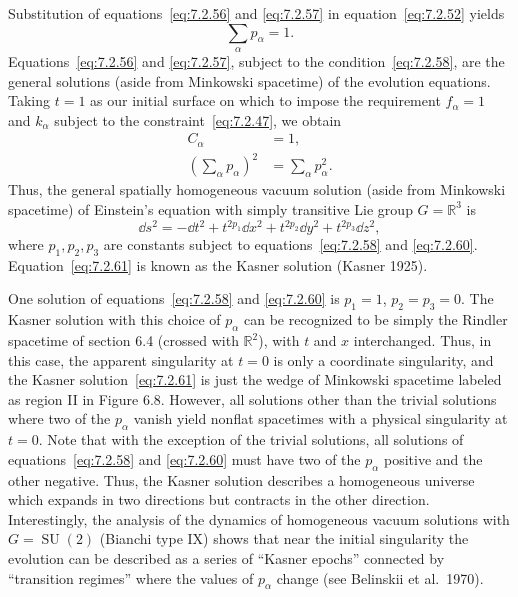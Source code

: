 Substitution of equations~\eqref{eq:7.2.56} and \eqref{eq:7.2.57} in
equation~\eqref{eq:7.2.52} yields
\begin{equation}
  \sum_\alpha p_\alpha=1 .
  \tag{7.2.58}\label{eq:7.2.58}
\end{equation}
Equations~\eqref{eq:7.2.56} and \eqref{eq:7.2.57}, subject to the
condition~\eqref{eq:7.2.58}, are the general solutions (aside from Minkowski
spacetime) of the evolution equations. Taking \(t=1\) as our initial surface on
which to impose the requirement \(f_\alpha=1\) and \(k_\alpha\) subject to the
constraint~\eqref{eq:7.2.47}, we obtain
\begin{align}
  C_\alpha&=1 ,
  \tag{7.2.59}\label{eq:7.2.59}\\
  \left(\sum_\alpha p_\alpha\right)^2
    &=\sum_\alpha p_\alpha^2 .
  \tag{7.2.60}\label{eq:7.2.60}
\end{align}
Thus, the general spatially homogeneous vacuum solution (aside from Minkowski
spacetime) of Einstein's equation with simply transitive Lie group
\(G=\mathbb R^3\) is
\begin{equation}
  \dd s^2=-\dd t^2+t^{2p_1}\dd x^2+t^{2p_2}\dd y^2+t^{2p_3}\dd z^2 ,
  \tag{7.2.61}\label{eq:7.2.61}
\end{equation}
where \(p_1,p_2,p_3\) are constants subject to equations~\eqref{eq:7.2.58} and
\eqref{eq:7.2.60}. Equation~\eqref{eq:7.2.61} is known as the Kasner solution
(Kasner 1925).

One solution of equations~\eqref{eq:7.2.58} and \eqref{eq:7.2.60} is
\(p_1=1\), \(p_2=p_3=0\). The Kasner solution with this choice of \(p_\alpha\)
can be recognized to be simply the Rindler spacetime of section 6.4 (crossed with
\(\mathbb R^2\)), with \(t\) and \(x\) interchanged. Thus, in this case, the
apparent singularity at \(t=0\) is only a coordinate singularity, and the Kasner
solution~\eqref{eq:7.2.61} is just the wedge of Minkowski spacetime labeled as
region II in Figure 6.8. However, all solutions other than the trivial solutions where
two of the \(p_\alpha\) vanish yield nonflat spacetimes with a physical singularity
at \(t=0\). Note that with the exception of the trivial solutions, all solutions of
equations~\eqref{eq:7.2.58} and \eqref{eq:7.2.60} must have two of the
\(p_\alpha\) positive and the other negative. Thus, the Kasner solution describes
a homogeneous universe which expands in two directions but contracts in the other
direction. Interestingly, the analysis of the dynamics of homogeneous vacuum
solutions with \(G=\operatorname{SU}(2)\) (Bianchi type IX) shows that near the
initial singularity the evolution can be described as a series of “Kasner epochs”
connected by “transition regimes” where the values of \(p_\alpha\) change (see
Belinskii et al.\ 1970).
